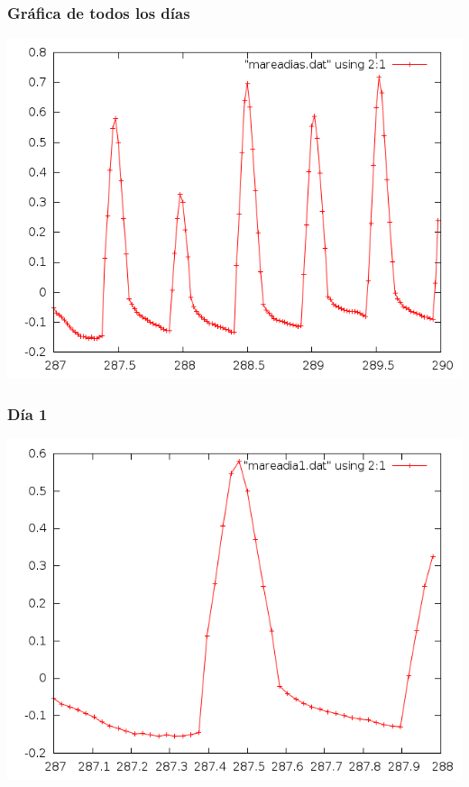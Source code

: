 \documentclass[10pt]{article}
\begin{document}
\subsubsection{Gráfica de todos los días}
\includegraphics[scale=0.6]{mareadias.png}

\subsubsection{Día 1}
\includegraphics[scale=0.6]{mareadia1.png}
\end{document}
